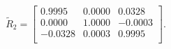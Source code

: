 \begin{equation*}
\widetilde{R}_{2} = 
\begin{bmatrix}
  0.9995 &   0.0000 &   0.0328 \\
  0.0000 &   1.0000 &  -0.0003 \\
 -0.0328 &   0.0003 &   0.9995 \\
\end{bmatrix}.
\end{equation*}
